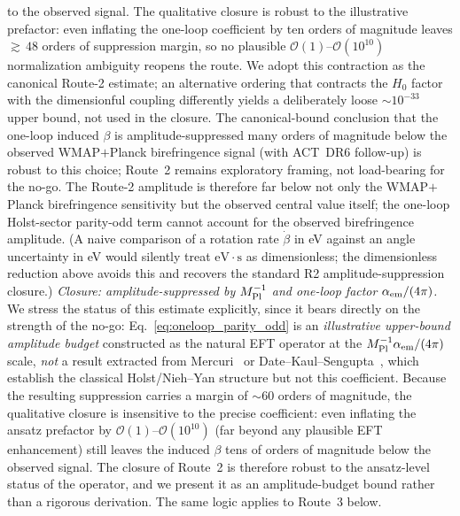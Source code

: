 \documentclass[aps,prd,twocolumn,superscriptaddress,showpacs,preprintnumbers,nofootinbib,longbibliography,floatfix]{revtex4-2}
\begin{document}
to the observed signal. The qualitative closure is robust to the illustrative
prefactor: even inflating the one-loop coefficient by ten orders of magnitude
leaves ${\gtrsim}\,48$ orders of suppression margin, so no plausible
$\mathcal{O}(1)$--$\mathcal{O}(10^{10})$ normalization ambiguity reopens the
route. We adopt this contraction as the canonical Route-2 estimate;
an alternative ordering that contracts the $H_0$ factor with the
dimensionful coupling differently yields a deliberately loose
$\sim 10^{-33}$ upper bound, not used in the closure.
The canonical-bound conclusion that the one-loop induced $\beta$ is
amplitude-suppressed many orders of magnitude below the observed
WMAP$+$Planck birefringence signal (with ACT~DR6 follow-up) is robust
to this choice; Route~2 remains exploratory framing, not load-bearing
for the no-go. The Route-2 amplitude is
therefore far below not only the WMAP$+$Planck birefringence sensitivity but the
observed central value itself; the one-loop Holst-sector parity-odd
term cannot account for the observed birefringence amplitude. (A naive comparison of a rotation rate $\dot\beta$ in eV against an angle
uncertainty in eV would silently treat $\mathrm{eV}\cdot\mathrm{s}$ as
dimensionless; the dimensionless reduction above avoids this and recovers
the standard R2 amplitude-suppression closure.)
\emph{Closure: amplitude-suppressed by $M_{\rm Pl}^{-1}$ and one-loop
factor $\alpha_{\rm em}/(4\pi)$.}
We stress the status of this estimate explicitly, since it bears directly on the
strength of the no-go: Eq.~\eqref{eq:oneloop_parity_odd} is an \emph{illustrative
upper-bound amplitude budget} constructed as the natural EFT operator at the
$M_{\rm Pl}^{-1}\alpha_{\rm em}/(4\pi)$ scale, \emph{not} a result extracted from
Mercuri~\cite{Mercuri2009} or Date--Kaul--Sengupta~\cite{DateKaulSengupta2009},
which establish the classical Holst/Nieh--Yan structure but not this coefficient.
Because the resulting suppression carries a margin of ${\sim}60$ orders of
magnitude, the qualitative closure is insensitive to the precise coefficient: even
inflating the ansatz prefactor by $\mathcal{O}(1)$--$\mathcal{O}(10^{10})$ (far
beyond any plausible EFT enhancement) still leaves the induced $\beta$ tens of
orders of magnitude below the observed signal. The closure of Route~2 is therefore
robust to the ansatz-level status of the operator, and we present it as an
amplitude-budget bound rather than a rigorous derivation. The same logic applies
to Route~3 below.
\end{document}
